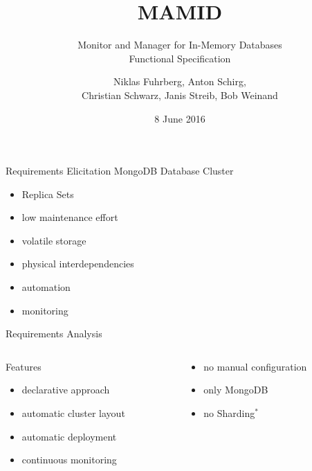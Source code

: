 \documentclass[11pt,aspectratio=169]{beamer}
\begin{document}
	\author{Niklas Fuhrberg, Anton Schirg,\\ Christian Schwarz, Janis Streib, Bob Weinand}
	\title{MAMID}
	\subtitle{Monitor and Manager for In-Memory Databases\\Functional Specification}
	\date{8 June 2016}
	\subject{Functional Specification}
	\frame[plain]{\maketitle}
	
	\begin{frame}{Requirements Elicitation}
		MongoDB Database Cluster
		\begin{itemize}
			\item<2-> Replica Sets
			\item<3-> low maintenance effort
			\item<4-> volatile storage
			\item<5-> physical interdependencies
			\item<6-> automation
			\item<7-> monitoring
		\end{itemize}
	\end{frame}
	
	
	\begin{frame}{Requirements Analysis}
		\begin{columns}
			\begin{column}{0.5\linewidth}
				Features
				\pause
				\begin{itemize}
					\item<2-> declarative approach
					\item<3-> automatic cluster layout
					\item<4-> automatic deployment
					\item<5-> continuous monitoring
				\end{itemize}
			\end{column}
			\begin{column}{0.5\linewidth}
				\onslide<6->{Demarcation}
				\begin{itemize}
					\item<7-> no manual configuration
					\item<8-> only MongoDB
					\item<9-> no Sharding$^*$
				\end{itemize}
				\vspace{1.5em} %
			\end{column}
		\end{columns}

	\end{frame}
	
\end{document}

